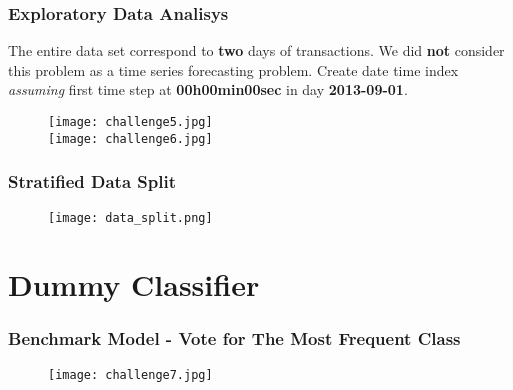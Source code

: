 \documentclass[11pt]{beamer}
\begin{document}
\begin{frame}[fragile]
  \frametitle{\normalsize{\textbf{
    Exploratory Data Analisys
  }}} 

  \vspace{0.15cm}

  \scriptsize{  

    \textbullet \: The entire data set correspond to \textbf{two} days of 
    transactions. We did \textbf{not} consider this problem as a time series 
    forecasting problem. Create date time index \textit{assuming} first time 
    step at \textbf{00h00min00sec} in day \textbf{2013-09-01}. 

    \begin{figure}[h!]
      \centering
      \texttt{[image: challenge5.jpg]} \\
      \texttt{[image: challenge6.jpg]} \\
    \end{figure}
  }
\end{frame}

\begin{frame}[fragile]
  \frametitle{\normalsize{\textbf{
    Stratified Data Split
  }}} 

  \vspace{0.15cm}

  \scriptsize{  

    \begin{figure}[h!]
      \centering
      \texttt{[image: data\_split.png]}
    \end{figure}
  }
\end{frame}

\section{Dummy Classifier}

\begin{frame}[fragile]
  \frametitle{\normalsize{\textbf{
    Benchmark Model - Vote for The Most Frequent Class
  }}} 

  \scriptsize{  

    \begin{figure}[h!]
      \centering
      \texttt{[image: challenge7.jpg]}
    \end{figure}
  }
\end{frame}
\end{document}
